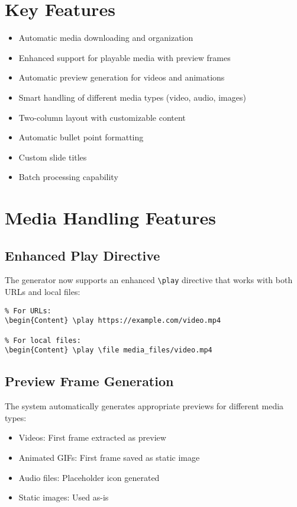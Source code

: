 \documentclass{article}
\begin{document}
\section{Key Features}
\begin{itemize}
    \item Automatic media downloading and organization
    \item Enhanced support for playable media with preview frames
    \item Automatic preview generation for videos and animations
    \item Smart handling of different media types (video, audio, images)
    \item Two-column layout with customizable content
    \item Automatic bullet point formatting
    \item Custom slide titles
    \item Batch processing capability
\end{itemize}

\section{Media Handling Features}
\subsection{Enhanced Play Directive}
The generator now supports an enhanced \texttt{\textbackslash play} directive that works with both URLs and local files:

\begin{tcolorbox}[title=Play Directive Examples]
\begin{verbatim}
% For URLs:
\begin{Content} \play https://example.com/video.mp4

% For local files:
\begin{Content} \play \file media_files/video.mp4
\end{verbatim}
\end{tcolorbox}

\subsection{Preview Frame Generation}
The system automatically generates appropriate previews for different media types:
\begin{itemize}
    \item Videos: First frame extracted as preview
    \item Animated GIFs: First frame saved as static image
    \item Audio files: Placeholder icon generated
    \item Static images: Used as-is
\end{itemize}
\end{document}
